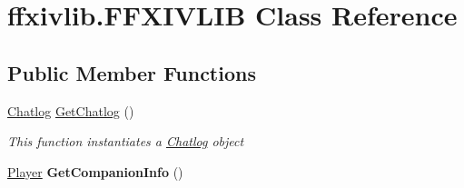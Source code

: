 \hypertarget{classffxivlib_1_1_f_f_x_i_v_l_i_b}{\section{ffxivlib.\-F\-F\-X\-I\-V\-L\-I\-B Class Reference}
\label{classffxivlib_1_1_f_f_x_i_v_l_i_b}
}
\subsection*{Public Member Functions}
\begin{DoxyCompactItemize}
\item 
\hyperlink{classffxivlib_1_1_chatlog}{Chatlog} \hyperlink{classffxivlib_1_1_f_f_x_i_v_l_i_b_a1d98f70dcbf35902584a11c95e785d29}{Get\-Chatlog} ()
\begin{DoxyCompactList}\small\item\em This function instantiates a \hyperlink{classffxivlib_1_1_chatlog}{Chatlog} object \end{DoxyCompactList}\item 
\hypertarget{classffxivlib_1_1_f_f_x_i_v_l_i_b_a73db6395aaa77cf29e9c71aa867e5729}{\hyperlink{classffxivlib_1_1_player}{Player} {\bfseries Get\-Companion\-Info} ()}\label{classffxivlib_1_1_f_f_x_i_v_l_i_b_a73db6395aaa77cf29e9c71aa867e5729}


\end{DoxyCompactItemize}
